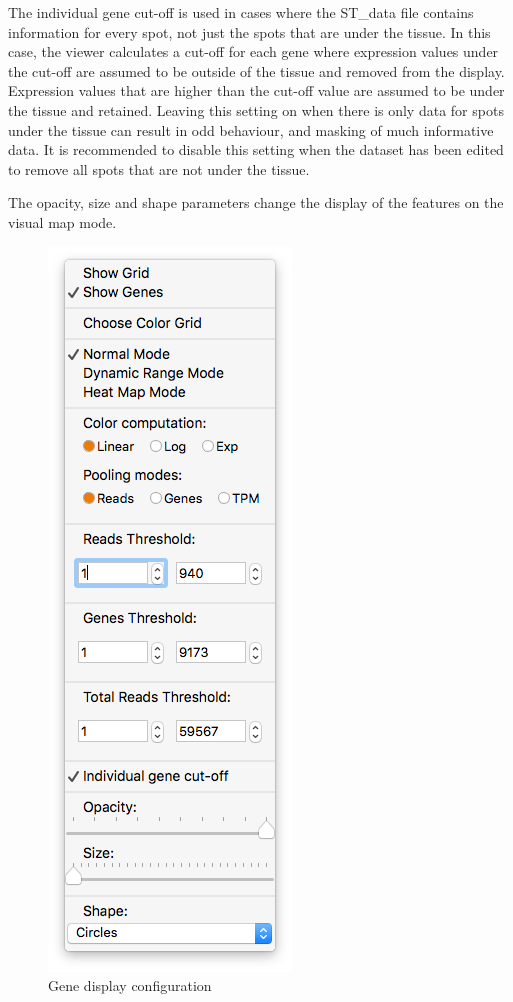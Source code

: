 \documentclass[10pt,a4paper,titlepage]{book}
\begin{document}
The individual gene cut-off is used in cases where the ST\_data file contains information for every spot, not just the spots that are under the tissue. In this case, the viewer calculates a cut-off for each gene where expression values under the cut-off are assumed to be outside of the tissue and removed from the display. Expression values that are higher than the cut-off value are assumed to be under the tissue and retained. Leaving this setting on when there is only data for spots under the tissue can result in odd behaviour, and masking of much informative data. It is recommended to disable this setting when the dataset has been edited to remove all spots that are not under the tissue.

The opacity, size and shape parameters change the display of the features on the visual map mode.

\begin{figure}[h]
	\centering
	\includegraphics[scale=0.5]{./Pictures/menu_1}
	\caption{Gene display configuration}
	\label{fig:gene_display_config}
\end{figure}
\end{document}
